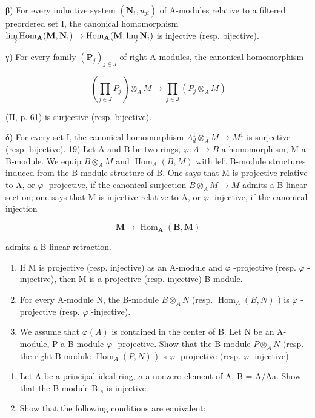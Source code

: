β) For every inductive system \((\mathbf{N}_{i}, u_{ji})\) of A-modules relative to a filtered preordered set I, the canonical homomorphism \(\varinjlim\operatorname{Hom}_{\mathbf{A}}(\mathbf{M}, \mathbf{N}_{i}) \to \operatorname{Hom}_{\mathbf{A}}(\mathbf{M}, \varinjlim \mathbf{N}_{i})\) is injective (resp. bijective).

γ) For every family \((\mathbf{P}_{j})_{j\in J}\) of right A-modules, the canonical homomorphism

\[
\left(\prod_ {j \in J} P _ {j}\right) \otimes_ {A} M \rightarrow \prod_ {j \in J} \left(P _ {j} \otimes_ {A} M\right)
\]

(II, p. 61) is surjective (resp. bijective).

δ) For every set I, the canonical homomorphism \(A_{d}^{1} \otimes_{A} M \to M^{1}\) is surjective (resp. bijective). 19) Let A and B be two rings, \(\varphi : A \to B\) a homomorphism, M a B-module. We equip \(B \otimes_{A} M\) and \(\operatorname{Hom}_{A}(B, M)\) with left B-module structures induced from the B-module structure of B. One says that M is projective relative to A, or \(\varphi\) -projective, if the canonical surjection \(B \otimes_{A} M \to M\) admits a B-linear section; one says that M is injective relative to A, or \(\varphi\) -injective, if the canonical injection

\[
\mathbf {M} \rightarrow \operatorname{Hom} _ {\mathbf {A}} (\mathbf {B}, \mathbf {M})
\]

admits a B-linear retraction.

\begin{enumerate}
\def\labelenumi{\alph{enumi})}
\item
  If M is projective (resp. injective) as an A-module and \(\varphi\) -projective (resp. \(\varphi\) -injective), then M is a projective (resp. injective) B-module.
\item
  For every A-module N, the B-module \(B \otimes_{A} N\) (resp. \(\operatorname{Hom}_{A}(B, N)\) ) is \(\varphi\) -projective (resp. \(\varphi\) -injective).
\item
  We assume that \(\varphi(A)\) is contained in the center of B. Let N be an A-module, P a B-module \(\varphi\) -projective. Show that the B-module \(P \otimes_{A} N\) (resp. the right B-module \(\operatorname{Hom}_{A}(P, N)\) ) is \(\varphi\) -projective (resp. \(\varphi\) -injective).
\end{enumerate}

\begin{enumerate}
\def\labelenumi{\arabic{enumi})}
\setcounter{enumi}{19}
\item
  Let A be a principal ideal ring, \(a\) a nonzero element of A, B = A/Aa. Show that the B-module B \(_{s}\) is injective.
\item
  Show that the following conditions are equivalent:
\end{enumerate}

